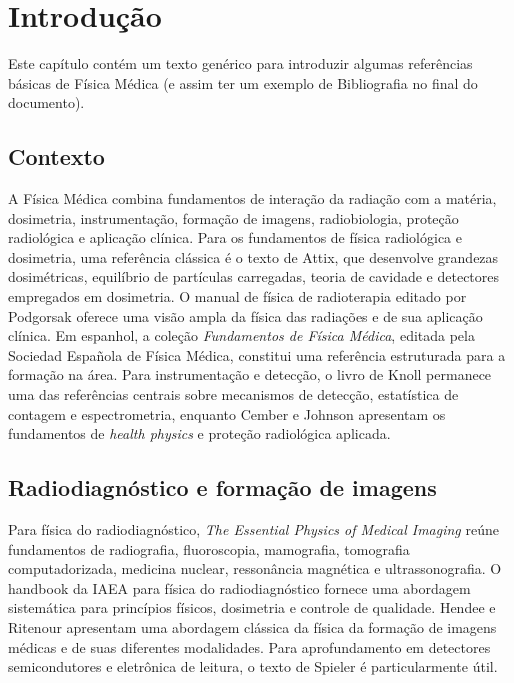 \chapter{Introdução}
\label{chap:introducao}

Este capítulo contém um texto genérico para introduzir algumas referências básicas de Física Médica (e assim ter um exemplo de Bibliografia no final do documento).

\section{Contexto}
\label{sec:contexto}

A Física Médica combina fundamentos de interação da radiação com a matéria, dosimetria, instrumentação, formação de imagens, radiobiologia, proteção radiológica e aplicação clínica. Para os fundamentos de física radiológica e dosimetria, uma referência clássica é o texto de Attix, que desenvolve grandezas dosimétricas, equilíbrio de partículas carregadas, teoria de cavidade e detectores empregados em dosimetria\supercite{attix1986}. O manual de física de radioterapia editado por Podgorsak oferece uma visão ampla da física das radiações e de sua aplicação clínica\supercite{podgorsak2005}. Em espanhol, a coleção \emph{Fundamentos de Física Médica}, editada pela Sociedad Española de Física Médica, constitui uma referência estruturada para a formação na área\supercite{brosed2011}. Para instrumentação e detecção, o livro de Knoll permanece uma das referências centrais sobre mecanismos de detecção, estatística de contagem e espectrometria\supercite{knoll2010}, enquanto Cember e Johnson apresentam os fundamentos de \emph{health physics} e proteção radiológica aplicada\supercite{cember2008}.

\section{Radiodiagnóstico e formação de imagens}

Para física do radiodiagnóstico, \emph{The Essential Physics of Medical Imaging} reúne fundamentos de radiografia, fluoroscopia, mamografia, tomografia computadorizada, medicina nuclear, ressonância magnética e ultrassonografia\supercite{bushberg2020}. O handbook da IAEA para física do radiodiagnóstico fornece uma abordagem sistemática para princípios físicos, dosimetria e controle de qualidade\supercite{iaea_diagnostic2014}. Hendee e Ritenour apresentam uma abordagem clássica da física da formação de imagens médicas e de suas diferentes modalidades\supercite{hendee2002}. Para aprofundamento em detectores semicondutores e eletrônica de leitura, o texto de Spieler é particularmente útil\supercite{spieler2005}.

